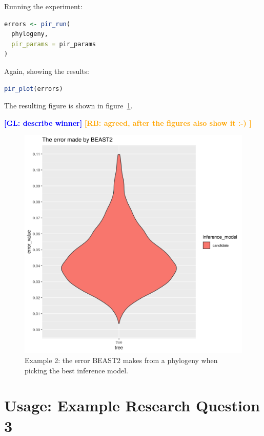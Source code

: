 \documentclass{article}
\newcommand{\giovanni}[1]{\textcolor{blue}{\textbf{[GL: #1]}}}
\newcommand{\richel}[1]{\textcolor{orange}{\textbf{[RB: #1]}}}
\begin{document}
Running the experiment:

\begin{lstlisting}[language=R, floatplacement=ht, frame=single]
errors <- pir_run(
  phylogeny,
  pir_params = pir_params
)
\end{lstlisting}

Again, showing the results:

\begin{lstlisting}[language=R, floatplacement=ht, frame=single]
pir_plot(errors)
\end{lstlisting}

The resulting figure is shown in figure~\ref{fig:example_2}.

\giovanni{describe winner}
\richel{agreed, after the figures also show it :-) }

\begin{figure}[ht]
  \includegraphics[width=\textwidth]{example_2_errors.png}
  \caption{
    Example 2: the error BEAST2 makes from a phylogeny when
    picking the best inference model.
  }
  \label{fig:example_2}
\end{figure}

\section{Usage: Example Research Question 3}
\end{document}
